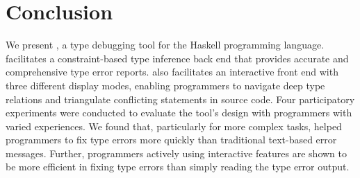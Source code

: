 \section{Conclusion}

We present \chameleon{}, a type debugging tool for the Haskell programming language. \chameleon{} facilitates a constraint-based type inference back end that provides accurate and comprehensive type error reports. \chameleon{} also facilitates an interactive front end with three different display modes, enabling programmers to navigate deep type relations and triangulate conflicting statements in source code. Four participatory experiments were conducted to evaluate the tool's design with programmers with varied experiences. We found that, particularly for more complex tasks, \chameleon{} helped programmers to fix type errors more quickly than traditional text-based error messages.  Further, programmers actively using \chameleon{} interactive features are shown to be more efficient in fixing type errors than simply reading the type error output.
